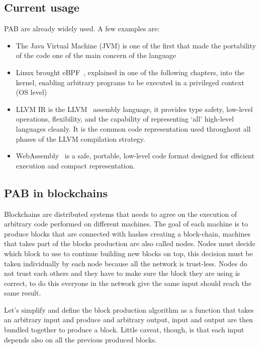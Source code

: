 \documentclass[../main.tex]{subfiles}
\begin{document}
\subsection{Current usage}

PAB are already widely used. A few examples are:

\begin{itemize}
  \item
        The Java Virtual Machine (JVM) is one of the first that made the portability of the code one of the main concern of the language
  \item
        Linux brought eBPF~\cite{ebpf}, explained in one of the following chapters, into the kernel, enabling arbitrary programs to be executed in a privileged context (OS level)
  \item
        LLVM IR is the LLVM~\cite{LLVM} assembly language, it provides type safety, low-level operations, flexibility, and the capability of representing ‘all’ high-level languages cleanly. It is the common code representation used throughout all phases of the LLVM compilation strategy.
  \item
        WebAssembly~\cite{wasm-core-spec} is a safe, portable, low-level code format designed for efficient execution and compact representation.
\end{itemize}

\subsection{PAB in blockchains}

Blockchains are distributed systems that needs to agree on the execution of arbitrary code performed on different machines. The goal of each machine is to produce blocks that are connected with hashes creating a block-chain, machines that takes part of the blocks production are also called nodes. Nodes must decide which block to use to continue building new blocks on top, this decision must be taken individually by each node because all the network is trust-less. Nodes do not trust each others and they have to make sure the block they are using is correct, to do this everyone in the network give the same input should reach the same result.

Let's simplify and define the block production algorithm as a function that takes an arbitrary input and produce and arbitrary output, input and output are then bundled together to produce a block. Little caveat, though, is that each input depends also on all the previous produced blocks.
\end{document}

